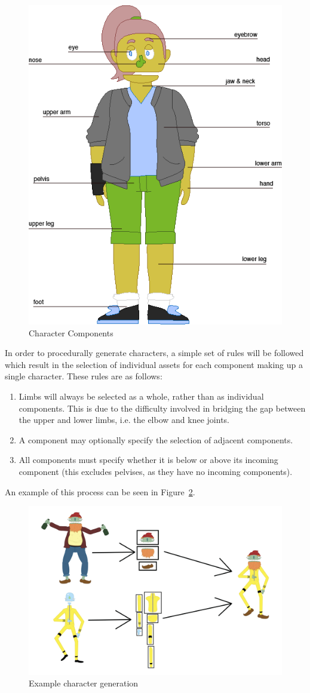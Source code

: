 \documentclass{GlobalDocument}
\begin{document}
\begin{figure}[htb]
\centering\includegraphics[width=.5\textwidth]{images/CharacterComponents}
\caption{Character Components}
\label{fig:character_components}
\end{figure}

In order to procedurally generate characters, a simple set of rules will be followed which result in the selection of individual assets for each component making up a single character. These rules are as follows:

\begin{enumerate}
\item{Limbs will always be selected as a whole, rather than as individual components. This is due to the difficulty involved in bridging the gap between the upper and lower limbs, i.e. the elbow and knee joints.}
\item{A component may optionally specify the selection of adjacent components.}
\item{All components must specify whether it is below or above its incoming component (this excludes pelvises, as they have no incoming components).}
\end{enumerate}

An example of this process can be seen in Figure~\ref{fig:character_generation_example}.

\begin{figure}[htb]
\centering\includegraphics[width=.7\textwidth]{images/CharacterGeneration_Diagram}
\caption{Example character generation}
\label{fig:character_generation_example}
\end{figure}
\end{document}
